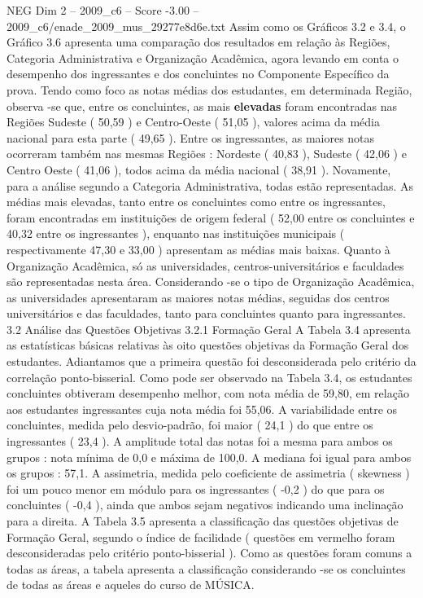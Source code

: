 \begin{textsample}{NEG Dim 2 – 2009\_c6 – Score -3.00 – 2009\_c6/enade\_2009\_mus\_29277e8d6e.txt}
Assim como os Gráficos 3.2 e 3.4, o Gráfico 3.6 apresenta uma comparação dos resultados em relação às Regiões, Categoria Administrativa e Organização Acadêmica, agora levando em conta o desempenho dos ingressantes e dos concluintes no Componente Específico da prova.
Tendo como foco as notas médias dos estudantes, em determinada Região, observa -se que, entre os concluintes, as mais \textbf{elevadas} foram encontradas nas Regiões Sudeste ( 50,59 ) e Centro-Oeste ( 51,05 ), valores acima da média nacional para esta parte ( 49,65 ).
Entre os ingressantes, as maiores notas ocorreram também nas mesmas Regiões : Nordeste ( 40,83 ), Sudeste ( 42,06 ) e Centro Oeste ( 41,06 ), todos acima da média nacional ( 38,91 ).
Novamente, para a análise segundo a Categoria Administrativa, todas estão representadas.
As médias mais elevadas, tanto entre os concluintes como entre os ingressantes, foram encontradas em instituições de origem federal ( 52,00 entre os concluintes e 40,32 entre os ingressantes ), enquanto nas instituições municipais ( respectivamente 47,30 e 33,00 ) apresentam as médias mais baixas.
Quanto à Organização Acadêmica, só as universidades, centros-universitários e faculdades são representadas nesta área.
Considerando -se o tipo de Organização Acadêmica, as universidades apresentaram as maiores notas médias, seguidas dos centros universitários e das faculdades, tanto para concluintes quanto para ingressantes. 3.2 Análise das Questões Objetivas 3.2.1 Formação Geral A Tabela 3.4 apresenta as estatísticas básicas relativas às oito questões objetivas da Formação Geral dos estudantes.
Adiantamos que a primeira questão foi desconsiderada pelo critério da correlação ponto-bisserial.
Como pode ser observado na Tabela 3.4, os estudantes concluintes obtiveram desempenho melhor, com nota média de 59,80, em relação aos estudantes ingressantes cuja nota média foi 55,06.
A variabilidade entre os concluintes, medida pelo desvio-padrão, foi maior ( 24,1 ) do que entre os ingressantes ( 23,4 ).
A amplitude total das notas foi a mesma para ambos os grupos : nota mínima de 0,0 e máxima de 100,0.
A mediana foi igual para ambos os grupos : 57,1.
A assimetria, medida pelo coeficiente de assimetria ( skewness ) foi um pouco menor em módulo para os ingressantes ( -0,2 ) do que para os concluintes ( -0,4 ), ainda que ambos sejam negativos indicando uma inclinação para a direita.
A Tabela 3.5 apresenta a classificação das questões objetivas de Formação Geral, segundo o índice de facilidade ( questões em vermelho foram desconsideradas pelo critério ponto-bisserial ).
Como as questões foram comuns a todas as áreas, a tabela apresenta a classificação considerando -se os concluintes de todas as áreas e aqueles do curso de MÚSICA.

\end{textsample}
